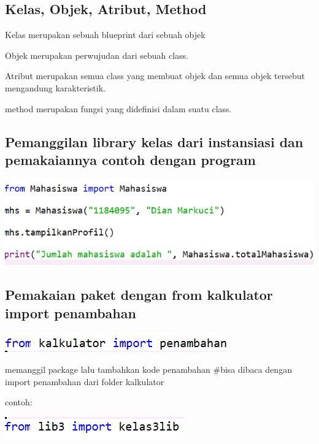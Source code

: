 \documentclass{article}
\begin{document}
\subsection{Kelas, Objek, Atribut, Method}
\item Kelas merupakan sebuah blueprint dari sebuah objek 
\item  Objek merupakan perwujudan dari sebuah class.
\item  Atribut merupakan semua class yang membuat objek dan semua objek tersebut mengandung karakteristik.
\item method merupakan fungsi yang dideﬁnisi dalam suatu class.

\subsection{Pemanggilan library kelas dari instansiasi dan pemakaiannya contoh dengan program}

\begin{center}
    \includegraphics[width=10cm\textwidth]{figure/manggil.png}
\end{center}

\subsection{Pemakaian paket dengan from kalkulator import penambahan}

\begin{center}
    \includegraphics[width=8cm\textwidth]{figure/kalkk.png}
\end{center}
memanggil package lalu tambahkan kode penambahan #bisa dibaca dengan import penambahan dari folder kalkulator 

contoh:
\begin{center}
    \includegraphics[width=6cm\textwidth]{figure/kalk.png}
\end{center}
\end{document}
